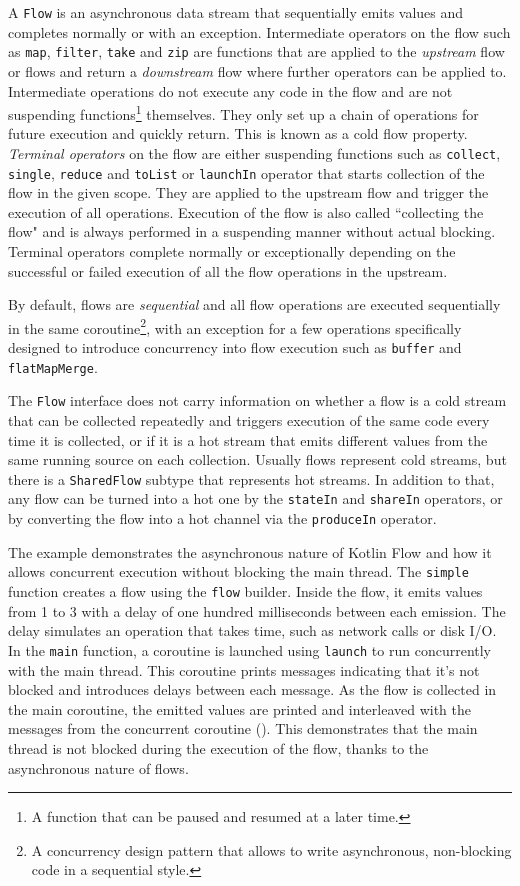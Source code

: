 A \texttt{Flow} is an asynchronous data stream that sequentially emits values and completes normally or with an exception. Intermediate operators on the flow such as \texttt{map}, \texttt{filter}, \texttt{take} and \texttt{zip} are functions that are applied to the \textit{upstream} flow or flows and return a \textit{downstream} flow where further operators can be applied to. Intermediate operations do not execute any code in the flow and are not suspending functions\footnote{A function that can be paused and resumed at a later time.} themselves. They only set up a chain of operations for future execution and quickly return. This is known as a cold flow property. \textit{Terminal operators} on the flow are either suspending functions such as \texttt{collect}, \texttt{single}, \texttt{reduce} and \texttt{toList} or \texttt{launchIn} operator that starts collection of the flow in the given scope. They are applied to the upstream flow and trigger the execution of all operations. Execution of the flow is also called ``collecting the flow" and is always performed in a suspending manner without actual blocking. Terminal operators complete normally or exceptionally depending on the successful or failed execution of all the flow operations in the upstream.

By default, flows are \textit{sequential} and all flow operations are executed sequentially in the same coroutine\footnote{A concurrency design pattern that allows to write asynchronous, non-blocking code in a sequential style.}, with an exception for a few operations specifically designed to introduce concurrency into flow execution such as \texttt{buffer} and \texttt{flatMapMerge}.

The \texttt{Flow} interface does not carry information on whether a flow is a cold stream that can be collected repeatedly and triggers execution of the same code every time it is collected, or if it is a hot stream that emits different values from the same running source on each collection. Usually flows represent cold streams, but there is a \texttt{SharedFlow} subtype that represents hot streams. In addition to that, any flow can be turned into a hot one by the \texttt{stateIn} and \texttt{shareIn} operators, or by converting the flow into a hot channel via the \texttt{produceIn} operator.

The example  demonstrates the asynchronous nature of Kotlin Flow and how it allows concurrent execution without blocking the main thread. The \texttt{simple} function creates a flow using the \texttt{flow} builder. Inside the flow, it emits values from 1 to 3 with a delay of one hundred milliseconds between each emission. The delay simulates an operation that takes time, such as network calls or disk I/O. In the \texttt{main} function, a coroutine is launched using \texttt{launch} to run concurrently with the main thread. This coroutine prints messages indicating that it's not blocked and introduces delays between each message. As the flow is collected in the main coroutine, the emitted values are printed and interleaved with the messages from the concurrent coroutine (). This demonstrates that the main thread is not blocked during the execution of the flow, thanks to the asynchronous nature of flows.

